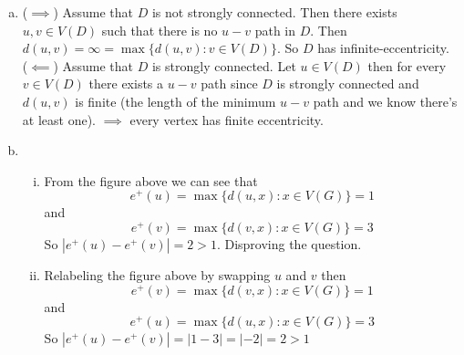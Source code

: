 \begin{enumerate}[a.]
    \item ($\implies$) Assume that $D$ is not strongly connected. Then there exists $u, v \in V(D)$ such that there is no $u-v$ path in $D$. Then $d(u, v) = \infty = \max\{d(u, v) : v \in V(D)\}$. So $D$ has infinite-eccentricity. \\
    ($\impliedby$) Assume that $D$ is strongly connected. Let $u \in V(D)$ then for every $v \in V(D)$ there exists a $u-v$ path since $D$ is strongly connected and $d(u, v)$ is finite (the length of the minimum $u-v$ path and we know there's at least one). $\implies$ every vertex has finite eccentricity. 
    \item 
        \begin{enumerate}[(i)]
            \begin{figure}[H]
            \centering
            \texttt{[image: 218.png]}
            \end{figure}
            \item From the figure above we can see that  $$e^+(u) = \max \{d(u, x) : x \in V(G)\} = 1$$ and $$e^+(v) = \max \{d(v, x) : x \in V(G)\} = 3$$ 
                So $|e^+(u) - e^+(v)| = 2 > 1$. 
                Disproving the question.
            \item Relabeling the figure above by swapping $u$ and $v$ then 
             $$e^+(v) = \max \{d(v, x) : x \in V(G)\} = 1$$ and $$e^+(u) = \max \{d(u, x) : x \in V(G)\} = 3$$ 
                So $|e^+(u) - e^+(v)| = |1 - 3| = |-2| = 2 > 1$
        \end{enumerate}
\end{enumerate}
